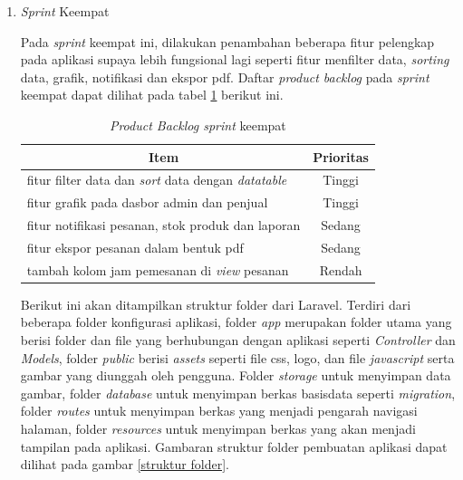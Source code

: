 \begin{enumerate}
	\item \textit{Sprint} Keempat
	\par Pada \textit{sprint} keempat ini, dilakukan penambahan beberapa fitur pelengkap pada aplikasi supaya lebih fungsional lagi seperti fitur menfilter data, \textit{sorting} data, grafik, notifikasi dan ekspor pdf. Daftar \textit{product backlog} pada \textit{sprint} keempat dapat dilihat pada tabel \ref*{tab:sprint keempat} berikut ini.

	\begin{table}[H]
		\begin{center}
		\caption{\textit{Product Backlog sprint} keempat}
		\label{tab:sprint keempat}
		\begin{tabular}{|l|c|}
		\hline
		\multicolumn{1}{|c|}{Item} & Prioritas\\
		\hline
		fitur filter data dan \textit{sort} data dengan \textit{datatable} & Tinggi\\
		\hline
		fitur grafik pada dasbor admin dan penjual & Tinggi\\
		\hline
		fitur notifikasi pesanan, stok produk dan laporan & Sedang\\
		\hline
		fitur ekspor pesanan dalam bentuk pdf & Sedang\\
		\hline
		tambah kolom jam pemesanan di \textit{view} pesanan & Rendah\\
		\hline
		\end{tabular}
		\end{center}
	\end{table}

	\par Berikut ini akan ditampilkan struktur folder dari Laravel. Terdiri dari beberapa folder konfigurasi aplikasi, folder \textit{app} merupakan folder utama yang berisi folder dan file yang berhubungan dengan aplikasi seperti \textit{Controller} dan \textit{Models}, folder \textit{public} berisi \textit{assets} seperti file css, logo, dan file \textit{javascript} serta gambar yang diunggah oleh pengguna. Folder \textit{storage} untuk menyimpan data gambar, folder \textit{database} untuk menyimpan berkas basisdata seperti \textit{migration}, folder \textit{routes} untuk menyimpan berkas yang menjadi pengarah navigasi halaman, folder \textit{resources} untuk menyimpan berkas yang akan menjadi tampilan pada aplikasi. Gambaran struktur folder pembuatan aplikasi dapat dilihat pada gambar \ref*{struktur folder}.


\end{enumerate}
